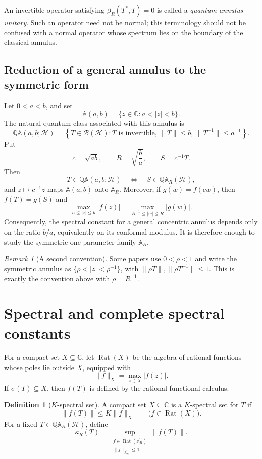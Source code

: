 \documentclass[11pt]{article}
\theoremstyle{definition}
\newtheorem{definition}[theorem]{Definition}
\theoremstyle{remark}
\newtheorem{remark}[theorem]{Remark}
\newcommand{\C}{\mathbb C}
\newcommand{\AR}{\mathbb A_R}
\newcommand{\QAR}{\mathbb Q\mathbb A_R}
\newcommand{\Rat}{\operatorname{Rat}}
\newcommand{\spec}{\sigma}
\begin{document}
An invertible operator satisfying \(\beta_R(T^*,T)=0\) is called a
\emph{quantum annulus unitary}.  Such an operator need not be normal;
this terminology should not be confused with a normal operator whose
spectrum lies on the boundary of the classical annulus.

\subsection{Reduction of a general annulus to the symmetric form}

Let \(0<a<b\), and set
\[
 \mathbb A(a,b)=\{z\in\C:a<|z|<b\}.
\]
The natural quantum class associated with this annulus is
\[
 \mathbb Q\mathbb A(a,b;\mathcal H)
 =
 \left\{
 T\in\mathcal B(\mathcal H):
 T\text{ is invertible},\
 \|T\|\leq b,\
 \|T^{-1}\|\leq a^{-1}
 \right\}.
\]
Put
\begin{equation}
 c=\sqrt{ab},
 \qquad
 R=\sqrt{\frac ba},
 \qquad
 S=c^{-1}T.
 \label{eq:scaling-parameters}
\end{equation}
Then
\[
 T\in\mathbb Q\mathbb A(a,b;\mathcal H)
 \quad\Longleftrightarrow\quad
 S\in\QAR(\mathcal H),
\]
and \(z\mapsto c^{-1}z\) maps \(\mathbb A(a,b)\) onto \(\AR\).
Moreover, if \(g(w)=f(cw)\), then \(f(T)=g(S)\) and
\[
 \max_{a\leq|z|\leq b}|f(z)|
 =
 \max_{R^{-1}\leq|w|\leq R}|g(w)|.
\]
Consequently, the spectral constant for a general concentric annulus
depends only on the ratio \(b/a\), equivalently on its conformal
modulus.  It is therefore enough to study the symmetric one-parameter
family \(\AR\).

\begin{remark}[A second convention]
Some papers use \(0<\rho<1\) and write the symmetric annulus as
\(\{\rho<|z|<\rho^{-1}\}\), with
\(\|\rho T\|,\|\rho T^{-1}\|\leq1\).  This is exactly the convention
above with \(\rho=R^{-1}\).
\end{remark}

\section{Spectral and complete spectral constants}

For a compact set \(X\subseteq\C\), let \(\Rat(X)\) be the algebra of
rational functions whose poles lie outside \(X\), equipped with
\[
 \|f\|_X=\max_{z\in X}|f(z)|.
\]
If \(\spec(T)\subseteq X\), then \(f(T)\) is defined by the rational
functional calculus.

\begin{definition}[\(K\)-spectral set]
\label{def:spectral-set}
A compact set \(X\subseteq\C\) is a \(K\)-spectral set for \(T\) if
\[
 \|f(T)\|\leq K\|f\|_X
 \qquad
 \bigl(f\in\Rat(X)\bigr).
\]
For a fixed \(T\in\QAR(\mathcal H)\), define
\[
 \kappa_R(T)
 =
 \sup_{\substack{f\in\Rat(\overline{\AR})\\
                  \|f\|_{\overline{\AR}}\leq1}}
 \|f(T)\|.
\]
\end{definition}
\end{document}
